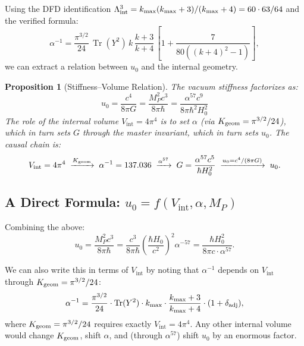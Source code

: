 \documentclass[11pt]{article}
\newcommand{\Tr}{\operatorname{Tr}}
\newcommand{\Vint}{V_{\mathrm{int}}}
\theoremstyle{plain}
\newtheorem{proposition}{Proposition}
\theoremstyle{definition}
\theoremstyle{remark}
\begin{document}
Using the DFD identification $\Lambda_{\rm int}^3 = k_{\max}(k_{\max}+3)/(k_{\max}+4) = 60 \cdot 63/64$ and the verified formula:
\begin{equation}
\alpha^{-1} = \frac{\pi^{3/2}}{24}\,\Tr(Y^2)\,k\,\frac{k+3}{k+4}\,
\left[1 + \frac{7}{80((k+4)^2-1)}\right],
\end{equation}
we can extract a relation between $u_0$ and the internal geometry.

\begin{proposition}[Stiffness--Volume Relation]
\label{prop:u0-Vint}
The vacuum stiffness factorizes as:
\begin{equation}
\boxed{u_0 = \frac{c^4}{8\pi G} = \frac{M_P^2 c^3}{8\pi\hbar}
= \frac{\alpha^{57} c^9}{8\pi\hbar^2 H_0^2}}
\label{eq:u0-factored}
\end{equation}
The role of the internal volume $\Vint = 4\pi^4$ is to set $\alpha$ (via
$K_{\rm geom} = \pi^{3/2}/24$), which in turn sets $G$ through the master
invariant, which in turn sets $u_0$. The causal chain is:
\begin{equation}
\Vint = 4\pi^4 \;\xrightarrow{K_{\rm geom}}\; \alpha^{-1} = 137.036
\;\xrightarrow{\alpha^{57}}\; G = \frac{\alpha^{57} c^5}{\hbar H_0^2}
\;\xrightarrow{u_0 = c^4/(8\pi G)}\; u_0.
\end{equation}
\end{proposition}

\subsection{A Direct Formula: $u_0 = f(\Vint, \alpha, M_P)$}

Combining the above:
\begin{equation}
u_0 = \frac{M_P^2 c^3}{8\pi\hbar}
= \frac{c^3}{8\pi\hbar}\left(\frac{\hbar H_0}{c^2}\right)^2 \alpha^{-57}
= \frac{\hbar H_0^2}{8\pi c \cdot \alpha^{57}}.
\end{equation}

We can also write this in terms of $\Vint$ by noting that $\alpha^{-1}$
depends on $\Vint$ through $K_{\rm geom} = \pi^{3/2}/24$:
\begin{equation}
\alpha^{-1} = \frac{\pi^{3/2}}{24} \cdot \Tr(Y^2) \cdot k_{\max} \cdot
\frac{k_{\max}+3}{k_{\max}+4} \cdot (1 + \delta_{\rm adj}),
\end{equation}
where $K_{\rm geom} = \pi^{3/2}/24$ requires exactly $\Vint = 4\pi^4$.
Any other internal volume would change $K_{\rm geom}$, shift $\alpha$,
and (through $\alpha^{57}$) shift $u_0$ by an enormous factor.
\end{document}

